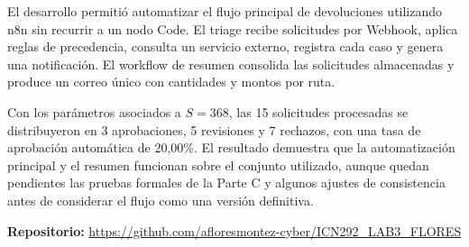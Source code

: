 \documentclass[11pt,a4paper]{article}
\begin{document}
El desarrollo permitió automatizar el flujo principal de devoluciones utilizando n8n sin recurrir a un nodo Code. El triage recibe solicitudes por Webhook, aplica reglas de precedencia, consulta un servicio externo, registra cada caso y genera una notificación. El workflow de resumen consolida las solicitudes almacenadas y produce un correo único con cantidades y montos por ruta.

Con los parámetros asociados a $S=368$, las 15 solicitudes procesadas se distribuyeron en 3 aprobaciones, 5 revisiones y 7 rechazos, con una tasa de aprobación automática de 20,00\%. El resultado demuestra que la automatización principal y el resumen funcionan sobre el conjunto utilizado, aunque quedan pendientes las pruebas formales de la Parte C y algunos ajustes de consistencia antes de considerar el flujo como una versión definitiva.

\vspace{0.5cm}
\textbf{Repositorio:} \url{https://github.com/afloresmontez-cyber/ICN292_LAB3_FLORES}
\end{document}
